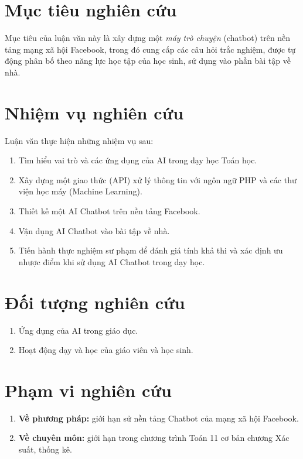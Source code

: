 \section{Mục tiêu nghiên cứu}
Mục tiêu của luận văn này là xây dựng một \textit{máy trò chuyện} (chatbot) trên nền tảng mạng xã hội Facebook, trong đó cung cấp các câu hỏi trắc nghiệm, được tự động phân bố theo năng lực học tập của học sinh, sử dụng vào phần bài tập về nhà.

\section{Nhiệm vụ nghiên cứu}
Luận văn thực hiện những nhiệm vụ sau:\par
\begin{enumerate}[label=\textbf{\thesection.\arabic*.},align=left,left=0cm..1cm]
	\item Tìm hiểu vai trò và các ứng dụng của AI trong dạy học Toán học.
	\item Xây dựng một giao thức (API) xử lý thông tin với ngôn ngữ PHP và các thư viện học máy (Machine Learning).
	\item Thiết kế một AI Chatbot trên nền tảng Facebook.
	\item Vận dụng AI Chatbot vào bài tập về nhà.
	\item Tiến hành thực nghiệm sư phạm để đánh giá tính khả thi và xác định ưu nhược điểm khi sử dụng AI Chatbot trong dạy học.
\end{enumerate}\par

\section{Đối tượng nghiên cứu}
\begin{enumerate}[label=\textbf{\thesection.\arabic*.},align=left,left=0cm..1cm]
\item Ứng dụng của AI trong giáo dục.\par
\item Hoạt động dạy và học của giáo viên và học sinh.\par
\end{enumerate}

\section{Phạm vi nghiên cứu}
\begin{enumerate}[label=\textbf{\thesection.\arabic*.},align=left,left=0cm..1cm]
	\item \textbf{Về phương pháp:} giới hạn sử nền tảng Chatbot của mạng xã hội Facebook.\par
	\item \textbf{Về chuyên môn:} giới hạn trong chương trình Toán 11 cơ bản chương Xác suất, thống kê.\par
\end{enumerate}

